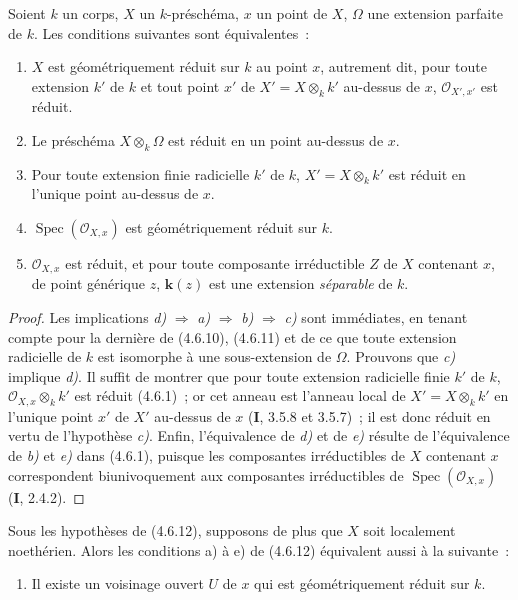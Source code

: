 \begin{proposition}[4.6.12]
\label{IV.2.4.6.12-fr}
Soient $k$ un corps, $X$ un $k$-préschéma, $x$ un point de $X$, $\Omega$ une
extension parfaite de $k$. Les conditions suivantes sont équivalentes~:
\begin{enumerate}
\item[\textup{a)}] $X$ est géométriquement réduit sur $k$ au point $x$, autrement dit,
pour toute extension $k'$ de $k$ et tout point $x'$ de
$X'=X\otimes_k k'$ au-dessus de $x$, $\mathcal O_{X',x'}$ est réduit.
\item[\textup{b)}] Le préschéma $X\otimes_k\Omega$ est réduit en un point au-dessus de
$x$.
\item[\textup{c)}] Pour toute extension finie radicielle $k'$ de $k$,
$X'=X\otimes_k k'$ est réduit en l'unique point au-dessus de $x$.
\item[\textup{d)}] $\operatorname{Spec}(\mathcal O_{X,x})$ est géométriquement réduit
sur $k$.
\item[\textup{e)}] $\mathcal O_{X,x}$ est réduit, et pour toute composante irréductible
$Z$ de $X$ contenant $x$, de point générique $z$, $\boldsymbol{k}(z)$ est une extension
\emph{séparable} de $k$.
\end{enumerate}
\end{proposition}

\begin{proof}
Les implications \emph{d)} $\Rightarrow$ \emph{a)} $\Rightarrow$ \emph{b)} $\Rightarrow$ \emph{c)} sont
immédiates, en tenant compte pour la dernière de (4.6.10), (4.6.11) et de ce
que toute extension radicielle de $k$ est isomorphe à une sous-extension de
$\Omega$. Prouvons que \emph{c)} implique \emph{d)}. Il suffit de montrer que pour toute
extension radicielle finie $k'$ de $k$, $\mathcal O_{X,x}\otimes_k k'$ est
réduit (4.6.1)~; or cet anneau est l'anneau local de $X'=X\otimes_k k'$ en
l'unique point $x'$ de $X'$ au-dessus de $x$ (\textbf{I}, 3.5.8 et 3.5.7)~; il est donc
réduit en vertu de l'hypothèse \emph{c)}. Enfin, l'équivalence de \emph{d)} et de \emph{e)}
résulte de l'équivalence de \emph{b)} et \emph{e)} dans (4.6.1), puisque les composantes
irréductibles de $X$ contenant $x$ correspondent biunivoquement aux composantes
irréductibles de $\operatorname{Spec}(\mathcal O_{X,x})$ (\textbf{I}, 2.4.2).
\end{proof}

\begin{corollary}[4.6.13]
\label{IV.2.4.6.13-fr}
Sous les hypothèses de \textup{(4.6.12)}, supposons de plus que $X$ soit localement
noethérien. Alors les conditions a) à e) de \textup{(4.6.12)} équivalent aussi à la
suivante~:
\begin{enumerate}
\item[\textup{f)}] Il existe un voisinage ouvert $U$ de $x$ qui est géométriquement
réduit sur $k$.
\end{enumerate}
\end{corollary}

